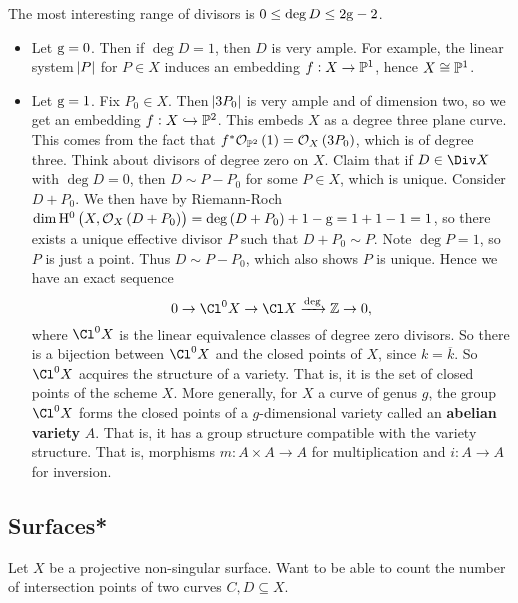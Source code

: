 The most interesting range of divisors is $ 0 \le \deg D \le 2\mathrm{g} - 2 $.

\begin{example*}
\hfill
\begin{itemize}
\item Let $ \mathrm{g} = 0 $. Then if $ \deg D = 1 $, then $ D $ is very ample. For example, the linear system $ \abs{P} $ for $ P \in X $ induces an embedding $ f : X \to \mathbb{P}^1 $, hence $ X \cong \mathbb{P}^1 $.
\item Let $ \mathrm{g} = 1 $. Fix $ P_0 \in X $. Then $ \abs{3P_0} $ is very ample and of dimension two, so we get an embedding $ f : X \hookrightarrow \mathbb{P}^2 $. This embeds $ X $ as a degree three plane curve. This comes from the fact that $ f^*\OOO_{\PP^2}\br{1} = \OOO_X\br{3P_0} $, which is of degree three. Think about divisors of degree zero on $ X $. Claim that if $ D \in \Div X $ with $ \deg D = 0 $, then $ D \sim P - P_0 $ for some $ P \in X $, which is unique. Consider $ D + P_0 $. We then have by Riemann-Roch $ \dim \H^0\br{X, \OOO_X\br{D + P_0}} = \deg \br{D + P_0} + 1 - \g = 1 + 1 - 1 = 1 $, so there exists a unique effective divisor $ P $ such that $ D + P_0 \sim P $. Note $ \deg P = 1 $, so $ P $ is just a point. Thus $ D \sim P - P_0 $, which also shows $ P $ is unique. Hence we have an exact sequence
$$ 0 \to \Cl^0 X \to \Cl X \xrightarrow{\deg} \ZZ \to 0, $$
where $ \Cl^0 X $ is the linear equivalence classes of degree zero divisors. So there is a bijection between $ \Cl^0 X $ and the closed points of $ X $, since $ k = \overline{k} $. So $ \Cl^0 X $ acquires the structure of a variety. That is, it is the set of closed points of the scheme $ X $. More generally, for $ X $ a curve of genus $ g $, the group $ \Cl^0 X $ forms the closed points of a $ g $-dimensional variety called an \textbf{abelian variety} $ A $. That is, it has a group structure compatible with the variety structure. That is, morphisms $ m : A \times A \to A $ for multiplication and $ i : A \to A $ for inversion.
\end{itemize}
\end{example*}

\subsection{Surfaces*}

Let $ X $ be a projective non-singular surface. Want to be able to count the number of intersection points of two curves $ C, D \subseteq X $.

